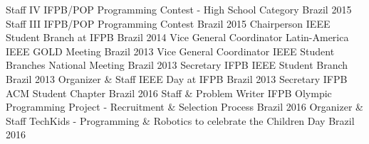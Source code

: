 \begin{cvhonors}
  \cvhonor
    {Staff} %
    {IV IFPB/POP Programming Contest - High School Category} %
    {Brazil} %
    {2015} %
  \cvhonor
    {Staff} %
    {III IFPB/POP Programming Contest} %
    {Brazil} %
    {2015} %
  \cvhonor
    {Chairperson} %
    {IEEE Student Branch at IFPB} %
    {Brazil} %
    {2014} %
  \cvhonor
    {Vice General Coordinator} %
    {Latin-America IEEE GOLD Meeting} %
    {Brazil} %
    {2013} %
  \cvhonor
    {Vice General Coordinator} %
    {IEEE Student Branches National Meeting} %
    {Brazil} %
    {2013} %
  \cvhonor
    {Secretary} %
    {IFPB IEEE Student Branch} %
    {Brazil} %
    {2013} %
\cvhonor
    {Organizer \& Staff} %
    {IEEE Day at IFPB} %
    {Brazil} %
    {2013} %
  \cvhonor
    {Secretary} %
    {IFPB ACM Student Chapter} %
    {Brazil} %
    {2016} %
  \cvhonor
    {Staff \& Problem Writer} %
    {IFPB Olympic Programming Project - Recruitment \& Selection Process} %
    {Brazil} %
    {2016} %
  \cvhonor
    {Organizer \& Staff} %
    {TechKids - Programming \& Robotics to celebrate the Children Day} %
    {Brazil} %
    {2016} %
\end{cvhonors}
